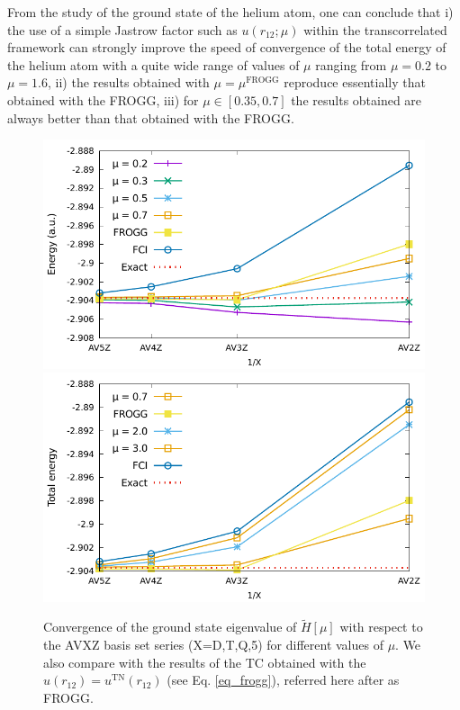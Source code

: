 \documentclass[aip,jcp,reprint,noshowkeys,superscriptaddress]{revtex4-1}
\newcommand{\mfrogg}[0]{\mu^\text{FROGG}}
\begin{document}
From the study of the ground state of the helium atom, one can conclude that i) the use of a simple Jastrow factor such as $u(r_{12};\mu)$ within the transcorrelated framework can strongly improve the speed of convergence of the total energy of the helium atom with a quite wide range of values of $\mu$ ranging from $\mu=0.2$ to $\mu=1.6$, 
ii) the results obtained with $\mu=\mfrogg$ reproduce essentially that obtained with the FROGG, 
iii) for $\mu \in[ 0.35,0.7]$ the results obtained are always better than that obtained with the FROGG. 
\begin{figure}
 \label{fig_conv_e_mu}
        \includegraphics[width=0.45\linewidth]{plots/He/Energy/He_E_conv_basis_small_mu.pdf}
        \includegraphics[width=0.45\linewidth]{plots/He/Energy/He_E_conv_basis_large_mu.pdf}\\
        \caption{Convergence of the ground state eigenvalue of $\tilde{H}[\mu]$ with respect to the AVXZ basis set series (X=D,T,Q,5) for different values of $\mu$. 
We also compare with the results of the TC obtained with the $u(r_{12}) = u^{\text{TN}}(r_{12})$ (see Eq. \eqref{eq_frogg}), referred here after as FROGG. }
\end{figure}
\end{document}
